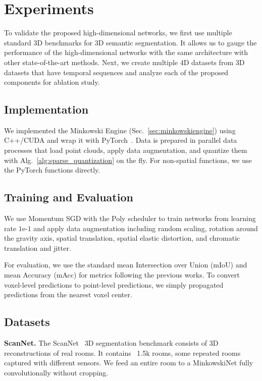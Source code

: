 \section{Experiments}
\label{sec:experiments}

To validate the proposed high-dimensional networks, we first use multiple standard 3D benchmarks for 3D semantic segmentation. It allows us to gauge the performance of the high-dimensional networks with the same architecture with other state-of-the-art methods. Next, we create multiple 4D datasets from 3D datasets that have temporal sequences and analyze each of the proposed components for ablation study.

\subsection{Implementation}
We implemented the Minkowski Engine (Sec.~\ref{sec:minkowskiengine}) using C++/CUDA and wrap it with PyTorch~\cite{pytorch}. Data is prepared in parallel data processes that load point clouds, apply data augmentation, and quantize them with Alg.~\ref{alg:sparse_quantization} on the fly. For non-spatial functions, we use the PyTorch functions directly.


\subsection{Training and Evaluation}
We use Momentum SGD with the Poly scheduler to train networks from learning rate $1\text{e-}1$ and apply data augmentation including random scaling, rotation around the gravity axis, spatial translation, spatial elastic distortion, and chromatic translation and jitter.

For evaluation, we use the standard mean Intersection over Union (mIoU) and mean Accuracy (mAcc) for metrics following the previous works. To convert voxel-level predictions to point-level predictions, we simply propagated predictions from the nearest voxel center.


\subsection{Datasets}

\textbf{ScanNet.}
The ScanNet~\cite{scannet} 3D segmentation benchmark consists of 3D reconstructions of real rooms. It contains ~1.5k rooms, some repeated rooms captured with different sensors. We feed an entire room to a MinkowskiNet fully convolutionally without cropping.

